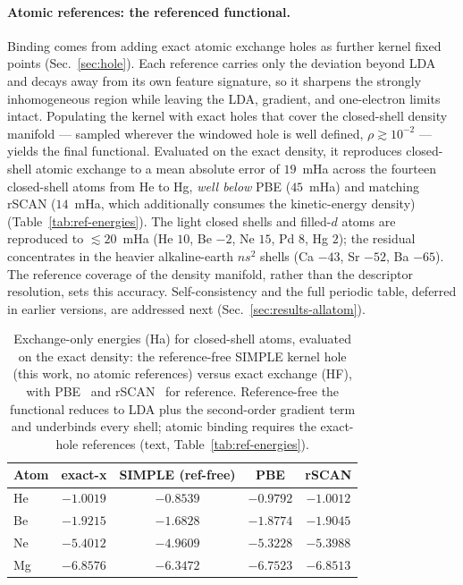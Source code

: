 \documentclass[aps,prb,reprint,superscriptaddress,nofootinbib]{revtex4-2}
\begin{document}
\paragraph*{Atomic references: the referenced functional.} Binding comes from adding exact
atomic exchange holes as further kernel fixed points (Sec.~\ref{sec:hole}). Each reference
carries only the deviation beyond LDA and decays away from its own feature signature, so it
sharpens the strongly inhomogeneous region while leaving the LDA, gradient, and one-electron
limits intact. Populating the kernel with exact holes that cover the closed-shell density
manifold --- sampled wherever the windowed hole is well defined, $\rho\gtrsim10^{-2}$ ---
yields the final functional. Evaluated on the exact density, it reproduces closed-shell atomic
exchange to a mean absolute error of $19$~mHa across the fourteen closed-shell atoms from He to
Hg, \emph{well below} PBE ($45$~mHa) and matching rSCAN ($14$~mHa, which additionally consumes the
kinetic-energy density) (Table~\ref{tab:ref-energies}). The light closed shells and filled-$d$ atoms
are reproduced to $\lesssim20$~mHa (He $10$, Be $-2$, Ne $15$, Pd $8$, Hg $2$); the residual
concentrates in the heavier alkaline-earth $ns^2$ shells (Ca $-43$, Sr $-52$, Ba $-65$). The
reference coverage of the density manifold, rather than the descriptor resolution, sets this
accuracy. Self-consistency and the full periodic table, deferred in earlier versions, are addressed
next (Sec.~\ref{sec:results-allatom}).

\begin{table}[tb]
\centering
\caption{Exchange-only energies (Ha) for closed-shell atoms, evaluated on the exact density:
the reference-free SIMPLE kernel hole (this work, no atomic references) versus exact exchange
(HF), with PBE~\cite{Perdew_1996} and rSCAN~\cite{Bart_k_2019} for reference. Reference-free the
functional reduces to LDA plus the second-order gradient term and underbinds every shell; atomic
binding requires the exact-hole references (text, Table~\ref{tab:ref-energies}).}
\label{tab:energies}
\begin{tabular}{lcccc}
\toprule
Atom & exact-x & SIMPLE (ref-free) & PBE & rSCAN \\
\midrule
He & $-1.0019$ & $-0.8539$ & $-0.9792$ & $-1.0012$ \\
Be & $-1.9215$ & $-1.6828$ & $-1.8774$ & $-1.9045$ \\
Ne & $-5.4012$ & $-4.9609$ & $-5.3228$ & $-5.3988$ \\
Mg & $-6.8576$ & $-6.3472$ & $-6.7523$ & $-6.8513$ \\
\bottomrule
\end{tabular}
\end{table}
\end{document}
